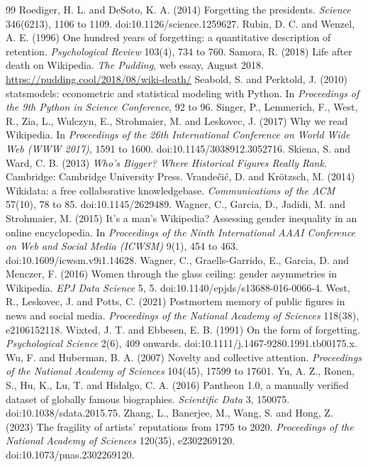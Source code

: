 \documentclass[11pt,a4paper]{article}
\begin{document}
\begin{thebibliography}{99}
 Roediger, H. L. and DeSoto, K. A. (2014) Forgetting the presidents. \textit{Science} 346(6213), 1106 to 1109. doi:10.1126/science.1259627.
 Rubin, D. C. and Wenzel, A. E. (1996) One hundred years of forgetting: a quantitative description of retention. \textit{Psychological Review} 103(4), 734 to 760.
 Samora, R. (2018) Life after death on Wikipedia. \textit{The Pudding}, web essay, August 2018. \url{https://pudding.cool/2018/08/wiki-death/}
 Seabold, S. and Perktold, J. (2010) statsmodels: econometric and statistical modeling with Python. In \textit{Proceedings of the 9th Python in Science Conference}, 92 to 96.
 Singer, P., Lemmerich, F., West, R., Zia, L., Wulczyn, E., Strohmaier, M. and Leskovec, J. (2017) Why we read Wikipedia. In \textit{Proceedings of the 26th International Conference on World Wide Web (WWW 2017)}, 1591 to 1600. doi:10.1145/3038912.3052716.
 Skiena, S. and Ward, C. B. (2013) \textit{Who's Bigger? Where Historical Figures Really Rank}. Cambridge: Cambridge University Press.
 Vrandečić, D. and Krötzsch, M. (2014) Wikidata: a free collaborative knowledgebase. \textit{Communications of the ACM} 57(10), 78 to 85. doi:10.1145/2629489.
 Wagner, C., Garcia, D., Jadidi, M. and Strohmaier, M. (2015) It's a man's Wikipedia? Assessing gender inequality in an online encyclopedia. In \textit{Proceedings of the Ninth International AAAI Conference on Web and Social Media (ICWSM)} 9(1), 454 to 463. doi:10.1609/icwsm.v9i1.14628.
 Wagner, C., Graells-Garrido, E., Garcia, D. and Menczer, F. (2016) Women through the glass ceiling: gender asymmetries in Wikipedia. \textit{EPJ Data Science} 5, 5. doi:10.1140/epjds/s13688-016-0066-4.
 West, R., Leskovec, J. and Potts, C. (2021) Postmortem memory of public figures in news and social media. \textit{Proceedings of the National Academy of Sciences} 118(38), e2106152118.
 Wixted, J. T. and Ebbesen, E. B. (1991) On the form of forgetting. \textit{Psychological Science} 2(6), 409 onwards. doi:10.1111/j.1467-9280.1991.tb00175.x.
 Wu, F. and Huberman, B. A. (2007) Novelty and collective attention. \textit{Proceedings of the National Academy of Sciences} 104(45), 17599 to 17601.
 Yu, A. Z., Ronen, S., Hu, K., Lu, T. and Hidalgo, C. A. (2016) Pantheon 1.0, a manually verified dataset of globally famous biographies. \textit{Scientific Data} 3, 150075. doi:10.1038/sdata.2015.75.
 Zhang, L., Banerjee, M., Wang, S. and Hong, Z. (2023) The fragility of artists' reputations from 1795 to 2020. \textit{Proceedings of the National Academy of Sciences} 120(35), e2302269120. doi:10.1073/pnas.2302269120.
\end{thebibliography}
\end{document}

